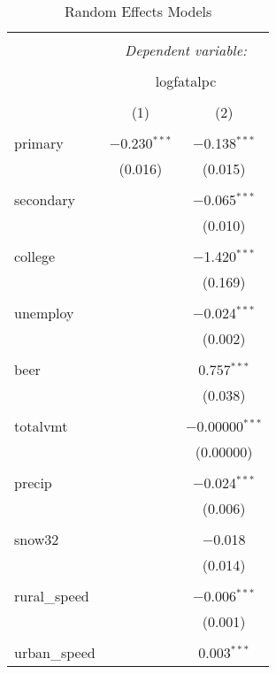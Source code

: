 \documentclass{article}
\begin{document}
\begin{table}[!htbp] \centering 
  \caption{Random Effects Models} 
  \label{} 
\footnotesize 
\begin{tabular}{@{\extracolsep{5pt}}lcc} 
\\[-1.8ex]\hline 
\hline \\[-1.8ex] 
 & \multicolumn{2}{c}{\textit{Dependent variable:}} \\ 
\cline{2-3} 
\\[-1.8ex] & \multicolumn{2}{c}{logfatalpc} \\ 
\\[-1.8ex] & (1) & (2)\\ 
\hline \\[-1.8ex] 
 primary & $-$0.230$^{***}$ & $-$0.138$^{***}$ \\ 
  & (0.016) & (0.015) \\ 
  & & \\ 
 secondary &  & $-$0.065$^{***}$ \\ 
  &  & (0.010) \\ 
  & & \\ 
 college &  & $-$1.420$^{***}$ \\ 
  &  & (0.169) \\ 
  & & \\ 
 unemploy &  & $-$0.024$^{***}$ \\ 
  &  & (0.002) \\ 
  & & \\ 
 beer &  & 0.757$^{***}$ \\ 
  &  & (0.038) \\ 
  & & \\ 
 totalvmt &  & $-$0.00000$^{***}$ \\ 
  &  & (0.00000) \\ 
  & & \\ 
 precip &  & $-$0.024$^{***}$ \\ 
  &  & (0.006) \\ 
  & & \\ 
 snow32 &  & $-$0.018 \\ 
  &  & (0.014) \\ 
  & & \\ 
 rural\_speed &  & $-$0.006$^{***}$ \\ 
  &  & (0.001) \\ 
  & & \\ 
 urban\_speed &  & 0.003$^{***}$ \\ 

\end{tabular}
\end{table}
\end{document}
